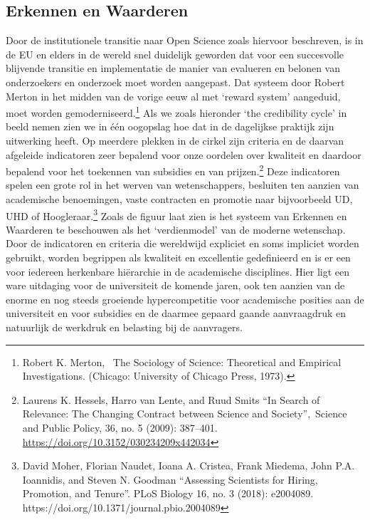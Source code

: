 \documentclass[empirical, authordate, ]{new-jote-article}
\begin{document}
	\subsection{Erkennen en Waarderen}



	Door de institutionele transitie naar Open Science zoals hiervoor beschreven, is in de EU en elders in de wereld snel duidelijk geworden dat voor een succesvolle blijvende transitie en implementatie de manier van evalueren en belonen van onderzoekers en onderzoek moet worden aangepast. Dat systeem door Robert Merton in het midden van de vorige eeuw al met ‘reward system' aangeduid, moet worden gemoderniseerd.\footnote{Robert K. Merton,  The Sociology of Science: Theoretical and Empirical Investigations. (Chicago: University of Chicago Press, 1973).} Als we zoals hieronder ‘the credibility cycle' in beeld nemen zien we in één oogopslag hoe dat in de dagelijkse praktijk zijn uitwerking heeft. Op meerdere plekken in de cirkel zijn criteria en de daarvan afgeleide indicatoren zeer bepalend voor onze oordelen over kwaliteit en daardoor bepalend voor het toekennen van subsidies en van prijzen.\footnote{Laurens K. Hessels, Harro van Lente, and Ruud Smits “In Search of Relevance: The Changing Contract between Science and Society”, Science and Public Policy, 36, no. 5 (2009): 387--401. \href{https://doi.org/10.3152/030234209x442034}{https://doi.org/10.3152/030234209x442034}} Deze indicatoren spelen een grote rol in het werven van wetenschappers, besluiten ten aanzien van academische benoemingen, vaste contracten en promotie naar bijvoorbeeld UD, UHD of Hoogleraar.\footnote{David Moher, Florian Naudet, Ioana A. Cristea, Frank Miedema, John P.A. Ioannidis, and Steven N. Goodman “Assessing Scientists for Hiring, Promotion, and Tenure”. PLoS Biology 16, no. 3 (2018): e2004089. https://doi.org/10.1371/journal.pbio.2004089} Zoals de figuur laat zien is het systeem van Erkennen en Waarderen te beschouwen als het ‘verdienmodel' van de moderne wetenschap. Door de indicatoren en criteria die wereldwijd expliciet en soms impliciet worden gebruikt, worden begrippen als kwaliteit en excellentie gedefinieerd en is er een voor iedereen herkenbare hiërarchie in de academische disciplines. Hier ligt een ware uitdaging voor de universiteit de komende jaren, ook ten aanzien van de enorme en nog steeds groeiende hypercompetitie voor academische posities aan de universiteit en voor subsidies en de daarmee gepaard gaande aanvraagdruk en natuurlijk de werkdruk en belasting bij de aanvragers.
\end{document}
